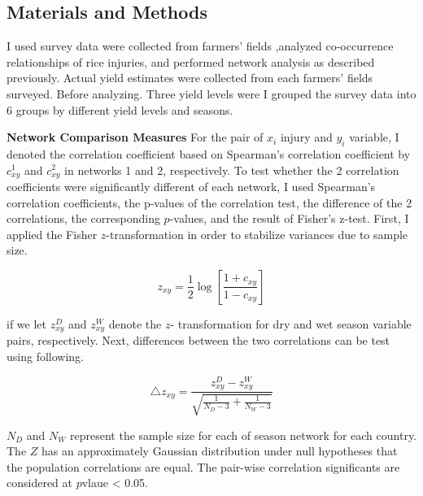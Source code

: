 \subsection{Materials and Methods}
I used survey data were collected from farmers' fields ,analyzed co-occurrence relationships of rice injuries, and performed network analysis as described previously. Actual yield estimates were collected from each farmers' fields surveyed. Before analyzing. Three yield levels were  I grouped the survey data into 6 groups by different yield levels and seasons.  

\textbf{Network Comparison Measures}
For the pair of $x_{i}$ injury and $y_{i}$ variable, I denoted the correlation coefficient based on Spearman's correlation coefficient by $c_{xy}^1$ and $c_{xy}^2$ in networks 1 and 2, respectively. To test whether the 2 correlation coefficients were significantly different of each network, I used Spearman's correlation coefficients, the p-values of the correlation test, the difference of the 2 correlations, the corresponding $p$-values, and the result of Fisher's z-test. First, I applied the Fisher $z$-transformation in order to stabilize variances due to sample size.

\begin{equation}
z_{xy} = \frac{1}{2} \log\left[{\frac{1 + c_{xy}}{1 - c_{xy}}}\right]
\end{equation}

if we let $z_{xy}^D $ and $z_{xy}^W$ denote the $z$- transformation for dry and wet season variable pairs, respectively. 
Next, differences between the two correlations can be test using following. 

\begin{equation}
\triangle z_{xy} = \frac{z_{xy}^D - z_{xy}^W}{\sqrt{\frac{1}{N_{D}-3}+ \frac{1}{N_{W}-3}}}
\end{equation}

$N_{D}$ and $N_{W}$ represent the sample size for each of season network for each country. The $Z$ has an approximately Gaussian distribution under null hypotheses that the population correlations are equal. The pair-wise correlation significants are considered at $p$vlaue < 0.05.


 

